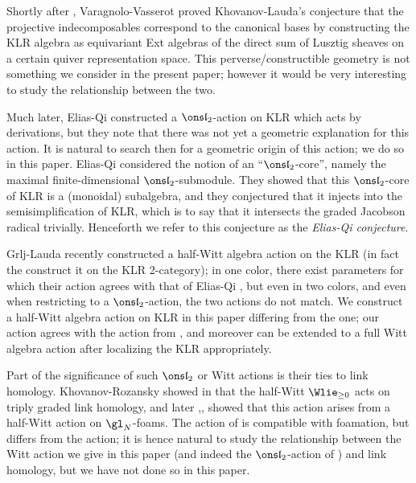 \documentclass[11pt,reqno]{amsart}
\begin{document}
Shortly after \cite{KL09}, Varagnolo-Vasserot \cite{varagnolo2011canonical} proved Khovanov-Lauda's conjecture that the projective indecomposables correspond to the canonical bases by constructing the KLR algebra as equivariant Ext algebras of the direct sum of Lusztig sheaves on a certain quiver representation space. This perverse/constructible geometry is not something we consider in the present paper; however it would be very interesting to study the relationship between the two.

Much later, Elias-Qi \cite{EQ23} constructed a $\sl_2$-action on KLR which acts by derivations, but they note that there was not yet a geometric explanation for this action. It is natural to search then for a geometric origin of this action; we do so in this paper. Elias-Qi \cite{EQ23} considered the notion of an ``$\sl_2$-core'', namely the maximal finite-dimensional $\sl_2$-submodule. They showed that this $\sl_2$-core of KLR is a (monoidal) subalgebra, and they conjectured that it injects into the semisimplification of KLR, which is to say that it intersects the graded Jacobson radical trivially. Henceforth we refer to this conjecture as the \textit{Elias-Qi conjecture}. 

Grlj-Lauda \cite{lauda2025action} recently constructed a half-Witt algebra action on the KLR (in fact the construct it on the KLR 2-category); in one color, there exist parameters for which their action agrees with that of Elias-Qi \cite{EQ23}, but even in two colors, and even when restricting to a $\sl_2$-action, the two actions do not match. We construct a half-Witt algebra action on KLR in this paper differing from the \cite{lauda2025action} one; our action agrees with the action from \cite{EQ23}, and moreover can be extended to a full Witt algebra action after localizing the KLR appropriately.

Part of the significance of such $\sl_2$ or Witt actions is their ties to link homology. Khovanov-Rozansky showed in \cite{khovanov2016positive} that the half-Witt $\Wlie_{\ge 0}$ acts on triply graded link homology, and later \cite{guerinroz2025action},\cite{qi2022symmetries},\cite{qi2023symmetries} showed that this action arises from a half-Witt action on $\gl_N$-foams. The action of \cite{lauda2025action} is compatible with foamation, but differs from the \cite{EQ23} action; it is hence natural to study the relationship between the Witt action we give in this paper (and indeed the $\sl_2$-action of \cite{EQ23}) and link homology, but we have not done so in this paper.
\end{document}
